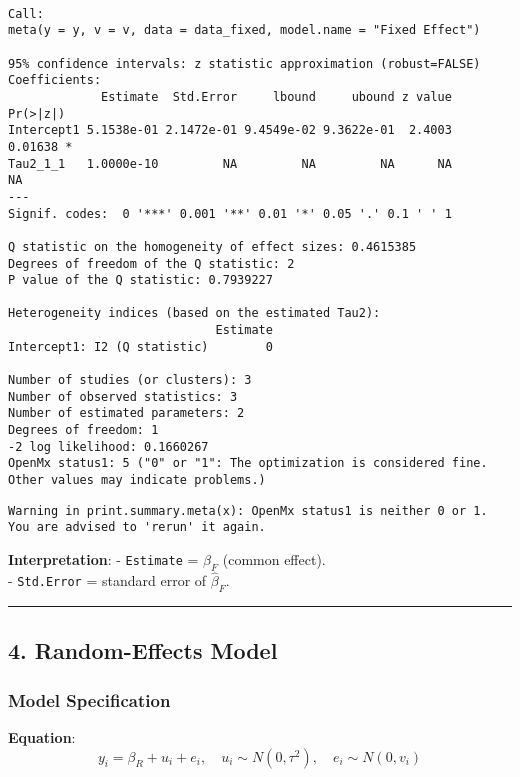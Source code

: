 \documentclass[
  letterpaper,
  DIV=11,
  numbers=noendperiod]{scrartcl}
\begin{document}
\begin{verbatim}

Call:
meta(y = y, v = v, data = data_fixed, model.name = "Fixed Effect")

95% confidence intervals: z statistic approximation (robust=FALSE)
Coefficients:
             Estimate  Std.Error     lbound     ubound z value Pr(>|z|)  
Intercept1 5.1538e-01 2.1472e-01 9.4549e-02 9.3622e-01  2.4003  0.01638 *
Tau2_1_1   1.0000e-10         NA         NA         NA      NA       NA  
---
Signif. codes:  0 '***' 0.001 '**' 0.01 '*' 0.05 '.' 0.1 ' ' 1

Q statistic on the homogeneity of effect sizes: 0.4615385
Degrees of freedom of the Q statistic: 2
P value of the Q statistic: 0.7939227

Heterogeneity indices (based on the estimated Tau2):
                             Estimate
Intercept1: I2 (Q statistic)        0

Number of studies (or clusters): 3
Number of observed statistics: 3
Number of estimated parameters: 2
Degrees of freedom: 1
-2 log likelihood: 0.1660267 
OpenMx status1: 5 ("0" or "1": The optimization is considered fine.
Other values may indicate problems.)
\end{verbatim}

\begin{verbatim}
Warning in print.summary.meta(x): OpenMx status1 is neither 0 or 1. You are advised to 'rerun' it again.
\end{verbatim}

\textbf{Interpretation}: - \texttt{Estimate} = \(\hat{\beta}_F\) (common
effect).\\
- \texttt{Std.Error} = standard error of \(\hat{\beta}_F\).

\begin{center}\rule{0.5\linewidth}{0.5pt}\end{center}

\subsection{\texorpdfstring{4. \textbf{Random-Effects
Model}}{4. Random-Effects Model}}\label{random-effects-model}

\subsubsection{Model Specification}\label{model-specification-1}

\textbf{Equation}: \[
y_i = \beta_R + u_i + e_i, \quad u_i \sim N(0, \tau^2), \quad e_i \sim N(0, v_i)
\]
\end{document}
